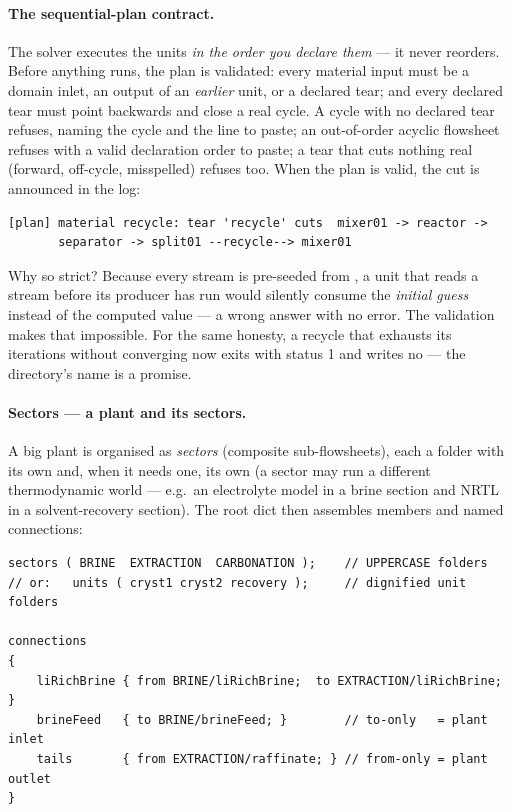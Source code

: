 \documentclass[11pt,a4paper]{article}
\begin{document}
\paragraph{The sequential-plan contract.}  The solver executes the
units \emph{in the order you declare them} --- it never reorders.
Before anything runs, the plan is validated: every material input must
be a domain inlet, an output of an \emph{earlier} unit, or a declared
tear; and every declared tear must point backwards and close a real
cycle.  A cycle with no declared tear refuses, naming the cycle and the
 line to paste; an out-of-order acyclic flowsheet
refuses with a valid declaration order to paste; a tear that cuts
nothing real (forward, off-cycle, misspelled) refuses too.  When the
plan is valid, the cut is announced in the log:

\begin{lstlisting}
[plan] material recycle: tear 'recycle' cuts  mixer01 -> reactor ->
       separator -> split01 --recycle--> mixer01
\end{lstlisting}

Why so strict?  Because every stream is pre-seeded from , a
unit that reads a stream before its producer has run would silently
consume the \emph{initial guess} instead of the computed value --- a
wrong answer with no error.  The validation makes that impossible.
For the same honesty, a recycle that exhausts its iterations without
converging now exits with status 1 and writes no  ---
the directory's name is a promise.

\paragraph{Sectors --- a plant and its sectors.}  A big plant is
organised as \emph{sectors} (composite sub-flowsheets), each a folder
with its own  and, when it needs one, its own
 (a sector may run a different
thermodynamic world --- e.g.\ an electrolyte model in a brine section
and NRTL in a solvent-recovery section).  The root dict then assembles
members and named connections:

\begin{lstlisting}[language=dict]
sectors ( BRINE  EXTRACTION  CARBONATION );    // UPPERCASE folders
// or:   units ( cryst1 cryst2 recovery );     // dignified unit folders

connections
{
    liRichBrine { from BRINE/liRichBrine;  to EXTRACTION/liRichBrine; }
    brineFeed   { to BRINE/brineFeed; }        // to-only   = plant inlet
    tails       { from EXTRACTION/raffinate; } // from-only = plant outlet
}
\end{lstlisting}
\end{document}
